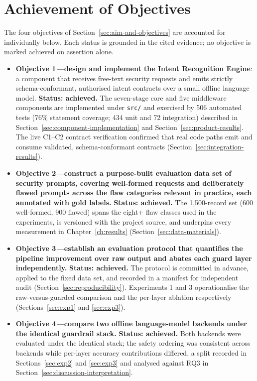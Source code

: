 \section{Achievement of Objectives}\label{sec:achievement-objectives}

The four objectives of Section~\ref{sec:aim-and-objectives} are accounted for
individually below. Each status is grounded in the cited evidence; no objective
is marked achieved on assertion alone.

\begin{itemize}
\item \textbf{Objective 1\emph{---}design and implement the Intent Recognition
Engine}\textnormal{: a component that receives free-text security requests and
emits strictly schema-conformant, authorised intent contracts over a small
offline language model.}
\textbf{Status: achieved.} The seven-stage core and five middleware components
are implemented under \texttt{src/} and exercised by 506 automated tests (76\%
statement coverage; 434 unit and 72 integration) described in
Section~\ref{sec:component-implementation} and
Section~\ref{sec:product-results}. The live C1--C2 contract verification
confirmed that real code paths emit and consume validated,
schema-conformant contracts (Section~\ref{sec:integration-results}).

\item \textbf{Objective 2\emph{---}construct a purpose-built evaluation data set
of security prompts, covering well-formed requests and deliberately flawed
prompts across the flaw categories relevant in practice, each annotated with
gold labels.}
\textbf{Status: achieved.} The 1,500-record set (600 well-formed, 900 flawed)
spans the eight+ flaw classes used in the experiments, is versioned with the
project source, and underpins every measurement in
Chapter~\ref{ch:results} (Section~\ref{sec:data-materials}).

\item \textbf{Objective 3\emph{---}establish an evaluation protocol that
quantifies the pipeline improvement over raw output and abates each guard layer
independently.}
\textbf{Status: achieved.} The protocol is committed in advance, applied to the
fixed data set, and recorded in a manifest for independent audit
(Section~\ref{sec:reproducibility}). Experiments 1 and 3 operationalise the
raw-versus-guarded comparison and the per-layer ablation respectively
(Sections~\ref{sec:exp1} and \ref{sec:exp3}).

\item \textbf{Objective 4\emph{---}compare two offline language-model backends
under the identical guardrail stack.}
\textbf{Status: achieved.} Both backends were evaluated under the identical
stack; the safety ordering was consistent across backends while per-layer
accuracy contributions differed, a split recorded in Sections~\ref{sec:exp2}
and \ref{sec:exp3} and analysed against RQ3 in
Section~\ref{sec:discussion-interpretation}.
\end{itemize}

